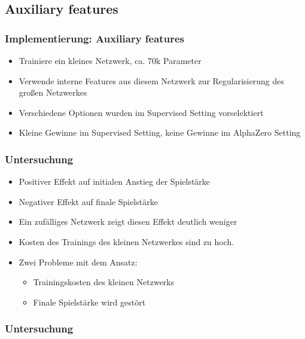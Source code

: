 \subsection{Auxiliary features}



\begin{frame}
 \frametitle{Implementierung: Auxiliary features}
  


\begin{itemize}
  \item \pause Trainiere ein kleines Netzwerk, ca. 70k Parameter
  \item \pause Verwende interne Features aus diesem Netzwerk zur Regularisierung des großen Netzwerkes
  \item \pause Verschiedene Optionen wurden im Supervised Setting vorselektiert
  \item \pause Kleine Gewinne im Supervised Setting, keine Gewinne im AlphaZero Setting
\end{itemize}

  
\end{frame}
\begin{frame}
 \frametitle{Untersuchung}
  


\begin{itemize}
  \item \pause Positiver Effekt auf initialen Anstieg der Spielstärke
  \item \pause Negativer Effekt auf finale Spielstärke
  \item \pause Ein zufälliges Netzwerk zeigt diesen Effekt deutlich weniger
  \item \pause Kosten des Trainings des kleinen Netzwerkes sind zu hoch.
  \item \pause Zwei Probleme mit dem Ansatz:
\begin{itemize}
  \item \pause Trainingskosten des kleinen Netzwerks
  \item \pause Finale Spielstärke wird gestört
\end{itemize}
\end{itemize}

  
\end{frame}
\begin{frame}
 \frametitle{Untersuchung}
  



  
\end{frame}
